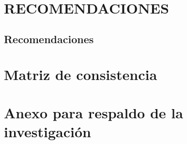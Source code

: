 \documentclass[12pt,a4paper,oneside]{book}
\begin{document}

\chapter{\hspace{0.23cm}RECOMENDACIONES}

\section{Recomendaciones}


\renewcommand*{\bibname}{REFERENCIAS}
\newpage



\appendix
\clearpage
\addappheadtotoc
\appendixpage

\chapter{Matriz de consistencia}

\chapter{Anexo para respaldo de la investigación}
\end{document}
